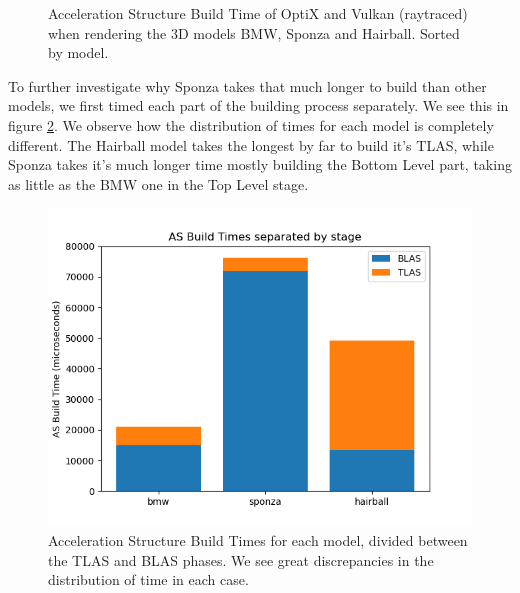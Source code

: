 \begin{figure}
    \caption{Acceleration Structure Build Time of OptiX and Vulkan (raytraced) when rendering the 3D models BMW, Sponza and Hairball. Sorted by model.}
    \label{as-build-time-geometry-comparison-graph}
\end{figure}

To further investigate why Sponza takes that much longer to build than other models, we first timed each part of the building process separately. We see this in figure \ref{as-build-time-decomposed}. We observe how the distribution of times for each model is completely different. The Hairball model takes the longest by far to build it's TLAS, while Sponza takes it's much longer time mostly building the Bottom Level part, taking as little as the BMW one in the Top Level stage.

\begin{figure}[hbt!]
    \centering
    \includegraphics[width=1.0\textwidth]{figuras/optix-accelbuildtimes-decomposed.png}
    \caption{Acceleration Structure Build Times for each model, divided between the TLAS and BLAS phases. We see great discrepancies in the distribution of time in each case.}
    \label{as-build-time-decomposed}
\end{figure}

